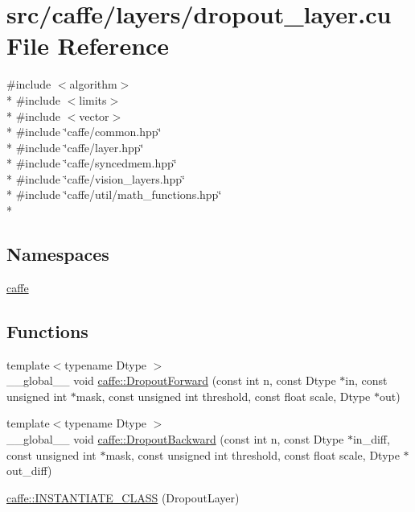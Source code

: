 \hypertarget{dropout__layer_8cu}{\section{src/caffe/layers/dropout\+\_\+layer.cu File Reference}
\label{dropout__layer_8cu}
}
{\ttfamily \#include $<$algorithm$>$}\\*
{\ttfamily \#include $<$limits$>$}\\*
{\ttfamily \#include $<$vector$>$}\\*
{\ttfamily \#include \char`\"{}caffe/common.\+hpp\char`\"{}}\\*
{\ttfamily \#include \char`\"{}caffe/layer.\+hpp\char`\"{}}\\*
{\ttfamily \#include \char`\"{}caffe/syncedmem.\+hpp\char`\"{}}\\*
{\ttfamily \#include \char`\"{}caffe/vision\+\_\+layers.\+hpp\char`\"{}}\\*
{\ttfamily \#include \char`\"{}caffe/util/math\+\_\+functions.\+hpp\char`\"{}}\\*
\subsection*{Namespaces}
\begin{DoxyCompactItemize}
\item 
 \hyperlink{namespacecaffe}{caffe}
\end{DoxyCompactItemize}
\subsection*{Functions}
\begin{DoxyCompactItemize}
\item 
{\footnotesize template$<$typename Dtype $>$ }\\\+\_\+\+\_\+global\+\_\+\+\_\+ void \hyperlink{namespacecaffe_acbb974c590152030733b853fdee8a384}{caffe\+::\+Dropout\+Forward} (const int n, const Dtype $\ast$in, const unsigned int $\ast$mask, const unsigned int threshold, const float scale, Dtype $\ast$out)
\item 
{\footnotesize template$<$typename Dtype $>$ }\\\+\_\+\+\_\+global\+\_\+\+\_\+ void \hyperlink{namespacecaffe_ad5a0ade82e9862148c3e957d66b19ec4}{caffe\+::\+Dropout\+Backward} (const int n, const Dtype $\ast$in\+\_\+diff, const unsigned int $\ast$mask, const unsigned int threshold, const float scale, Dtype $\ast$out\+\_\+diff)
\item 
\hyperlink{namespacecaffe_a3ddfb0dd062592a2e7b625246518184c}{caffe\+::\+I\+N\+S\+T\+A\+N\+T\+I\+A\+T\+E\+\_\+\+C\+L\+A\+S\+S} (Dropout\+Layer)
\end{DoxyCompactItemize}
